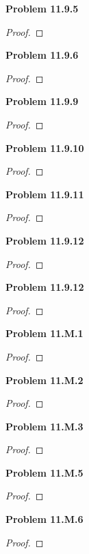 \documentclass[12pt]{article}
\begin{document}
\textbf{Problem 11.9.5}
\begin{proof}

\end{proof}
\textbf{Problem 11.9.6}
\begin{proof}

\end{proof}
\textbf{Problem 11.9.9}
\begin{proof}

\end{proof}
\textbf{Problem 11.9.10}
\begin{proof}

\end{proof}
\textbf{Problem 11.9.11}
\begin{proof}

\end{proof}
\textbf{Problem 11.9.12}
\begin{proof}

\end{proof}
\textbf{Problem 11.9.12}
\begin{proof}

\end{proof}
\textbf{Problem 11.M.1}
\begin{proof}

\end{proof}
\textbf{Problem 11.M.2}
\begin{proof}

\end{proof}
\textbf{Problem 11.M.3}
\begin{proof}

\end{proof}
\textbf{Problem 11.M.5}
\begin{proof}

\end{proof}
\textbf{Problem 11.M.6}
\begin{proof}

\end{proof}
\end{document}

